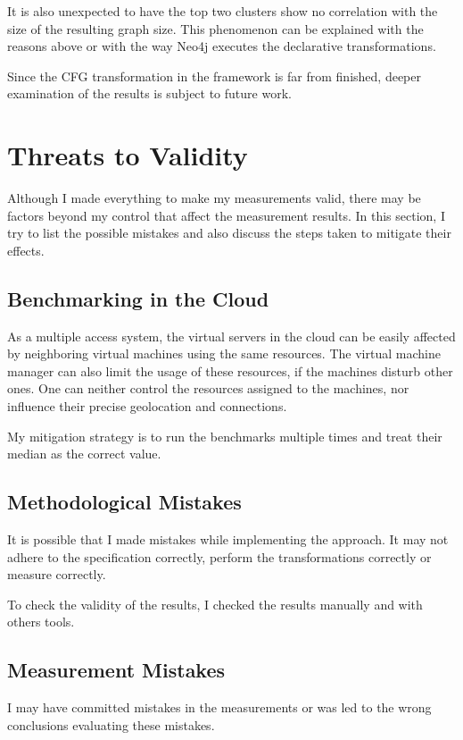 It is also unexpected to have the top two clusters show no correlation with the size of the resulting graph size. This phenomenon can be explained with the reasons above or with the way Neo4j executes the declarative transformations.

Since the CFG transformation in the framework is far from finished, deeper examination of the results is subject to future work.


\section{Threats to Validity}
\label{sect:evaluation-threats}
Although I made everything to make my measurements valid, there may be factors beyond my control that affect the measurement results. In this section, I try to list the possible mistakes and also discuss the steps taken to mitigate their effects.

\subsection{Benchmarking in the Cloud} As a multiple access system, the virtual servers in the cloud can be easily affected by neighboring virtual machines using the same resources. The virtual machine manager can also limit the usage of these resources, if the machines disturb other ones. One can neither control the resources assigned to the machines, nor influence their precise geolocation and connections.

My mitigation strategy is to run the benchmarks multiple times and treat their median as the correct value.

\subsection{Methodological Mistakes} It is possible that I made mistakes while implementing the approach. It may not adhere to the specification correctly, perform the transformations correctly or measure correctly.

To check the validity of the results, I checked the results manually and with others tools.

\subsection{Measurement Mistakes} I may have committed mistakes in the measurements or was led to the wrong conclusions evaluating these mistakes.
